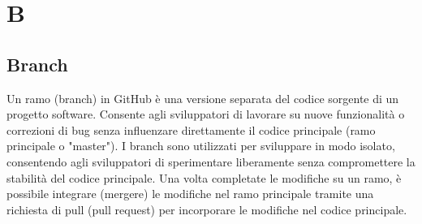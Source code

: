 \section{B} 
\subsection{Branch} 
Un ramo (branch) in GitHub è una versione separata del codice sorgente di un progetto software. Consente agli sviluppatori di lavorare su nuove funzionalità o correzioni di bug senza influenzare direttamente il codice principale (ramo principale o "master"). I branch sono utilizzati per sviluppare in modo isolato, consentendo agli sviluppatori di sperimentare liberamente senza compromettere la stabilità del codice principale. Una volta completate le modifiche su un ramo, è possibile integrare (mergere) le modifiche nel ramo principale tramite una richiesta di pull (pull request) per incorporare le modifiche nel codice principale.
